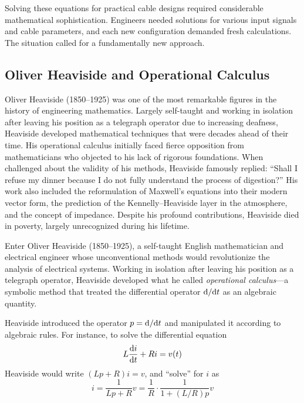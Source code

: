 Solving these equations for practical cable designs required considerable mathematical sophistication. Engineers needed solutions for various input signals and cable parameters, and each new configuration demanded fresh calculations. The situation called for a fundamentally new approach.

\subsection{Oliver Heaviside and Operational Calculus}

\begin{historicalbox}
Oliver Heaviside (1850--1925) was one of the most remarkable figures in the history of engineering mathematics. Largely self-taught and working in isolation after leaving his position as a telegraph operator due to increasing deafness, Heaviside developed mathematical techniques that were decades ahead of their time. His operational calculus initially faced fierce opposition from mathematicians who objected to his lack of rigorous foundations. When challenged about the validity of his methods, Heaviside famously replied: ``Shall I refuse my dinner because I do not fully understand the process of digestion?'' His work also included the reformulation of Maxwell's equations into their modern vector form, the prediction of the Kennelly--Heaviside layer in the atmosphere, and the concept of impedance. Despite his profound contributions, Heaviside died in poverty, largely unrecognized during his lifetime.
\end{historicalbox}

Enter Oliver Heaviside (1850--1925), a self-taught English mathematician and electrical engineer whose unconventional methods would revolutionize the analysis of electrical systems. Working in isolation after leaving his position as a telegraph operator, Heaviside developed what he called \textit{operational calculus}---a symbolic method that treated the differential operator $\mathrm{d}/\mathrm{d} t$ as an algebraic quantity.

Heaviside introduced the operator $p = \mathrm{d}/\mathrm{d} t$ and manipulated it according to algebraic rules. For instance, to solve the differential equation
\begin{equation}
L\frac{\mathrm{d} i}{\mathrm{d} t} + Ri = v(t)
\end{equation}
Heaviside would write $(Lp + R)i = v$, and ``solve'' for $i$ as
\begin{equation}
i = \frac{1}{Lp + R}v = \frac{1}{R}\cdot\frac{1}{1 + (L/R)p}v
\end{equation}

